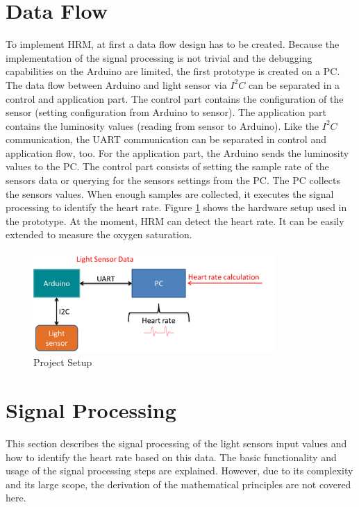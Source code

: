 \documentclass[notitlepage]{scrreprt}
\begin{document}
\section{Data Flow}
To implement HRM, at first a data flow design has to be created. Because the implementation of the signal processing is not trivial and the debugging capabilities on the Arduino are limited, the first prototype is created on a PC. The data flow between Arduino and light sensor via $I^2C$ can be separated in a control and application part. The control part contains the configuration of the sensor (setting configuration from Arduino to sensor). The application part contains the luminosity values (reading from sensor to Arduino). Like the $I^2C$ communication, the UART communication can be separated in control and application flow, too. For the application part, the Arduino sends the luminosity values to the PC. The control part consists of setting the sample rate of the sensors data or querying for the sensors settings from the PC. The PC collects the sensors values. When enough samples are collected, it executes the signal processing to identify the heart rate. Figure \ref{fig:data-flow2} shows the hardware setup used in the prototype. At the moment, HRM can detect the heart rate. It can be easily extended to measure the oxygen saturation.

\begin{figure}[H]
	\centering
	\includegraphics[width=350px]{images/general_dataFlow_second.png}
	\caption{Project Setup}
	\label{fig:data-flow2}
\end{figure}

\section{Signal Processing}
\label{sec:signal-processing}
This section describes the signal processing of the light sensors input values and how to identify the heart rate based on this data. The basic functionality and usage of the signal processing steps are explained. However, due to its complexity and its large scope, the derivation of the mathematical principles are not covered here.
\end{document}
